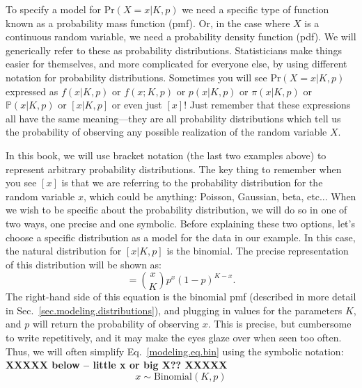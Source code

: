 To specify a model for $\text{Pr}(X=x|K,p)$ we need a specific type of
function known as a probability mass function (pmf). Or, in the case
where $X$ is a continuous random variable, we need a probability density function
(pdf). We will generically refer to these as probability distributions.
Statisticians make things easier for themselves,
and more complicated for everyone else, by using different notation
for probability distributions. Sometimes you will see
$\text{Pr}(X=x|K,p)$ expressed as $f(x|K,p)$ or $f(x; K,p)$ or
$p(x|K,p)$ or $\pi(x|K,p)$ or $\mathbb{P}(x|K,p)$ or $[x|K,p]$ or even
just $[x]$! Just remember that these expressions all have the same
meaning---they are all probability distributions which tell us the
probability of observing any possible realization of the random
variable $X$.

In this book, we will use bracket notation (the last two
examples above) to represent arbitrary probability distributions. The
key thing to remember when you see $[x]$ is that we are referring to
the probability distribution for the random variable $x$, which could
be anything: Poisson, Gaussian, beta, etc... When
we wish to be specific about the probability distribution, we will do
so in one of two ways, one precise and one symbolic. Before explaining
these two options, let's choose a specific distribution as a model for
the data in our example. In this case, the natural distribution for
$[x|K,p]$ is the binomial. The precise representation of this
distribution will be shown as:
\begin{equation}
  [x|K,p] = %
             \binom{x}{K}p^x(1-p)^{K-x}.
  \label{modeling.eq.bin}
\end{equation}
The right-hand side of this equation is the binomial pmf (described in
more detail in Sec.~\ref{sec.modeling.distributions}), and plugging in
values for the parameters $K$, and $p$ will return the probability of
observing $x$. This is precise, but cumbersome to write repetitively,
and it may make the eyes glaze over when seen too often. Thus, we will
often simplify Eq.~\ref{modeling.eq.bin} using the symbolic notation:
{\bf XXXXX below -- little x or big X?? XXXXX}
\begin{equation}
  x \sim \text{Binomial}(K, p)
  \label{modeling.eq.binsym}
\end{equation}
